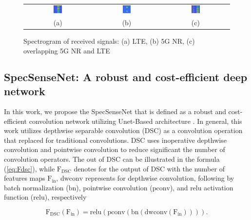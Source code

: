 \documentclass[journal]{IEEEtran} %
\begin{document}
\begin{figure}[!t]
    \centering
    \footnotesize
    \begin{tabular}{ccc}
        \includegraphics[width=0.13\textwidth]{img/LTE_frame_0.png}  & \includegraphics[width=0.13\textwidth]{img/NR_frame_1506.png} &
        \includegraphics[width=0.13\textwidth]
        {img/LTE_NR_frame_0.png} 
        \\
        (a) & (b) & (c)
    \end{tabular}
    \caption{Spectrogram of received signals: (a) LTE, (b) 5G NR, (c) overlapping 5G NR and LTE}
    \label{fig2}
\end{figure}

\subsection{SpecSenseNet: A robust and cost-efficient deep network}
In this work, we propose the SpecSenseNet that is defined as a robust and cost-efficient convolution network utilizing Unet-Based architecture \cite{ronneberger2015u}. In general, this work utilizes depthwise separable convolution (DSC) \cite{CholletXception} as a convolution operation that replaced for traditional convolutions. DSC uses inoperative depthwise convolution and pointwise convolution to reduce significant the number of convolution operators. The out of DSC can be illustrated in the formula (\ref{eq:Fdsc}), while $\mathrm{F_{\text{DSC}}}$ denotes for the output of DSC with the number of features maps $\mathrm{F_{\text{in}}}$, $\mathrm{dwconv}$ represents for depthwise convolution, following by batch normalization ($\mathrm{bn}$), pointwise convolution ($\mathrm{pconv}$), and relu activation function ($\mathrm{relu}$), respectively

\begin{equation}
    \mathrm{F_{\text{DSC}}(F_{in}) = relu(pconv(bn(dwconv(F_{in}))))}.
    \label{eq:Fdsc}
\end{equation}
\end{document}
